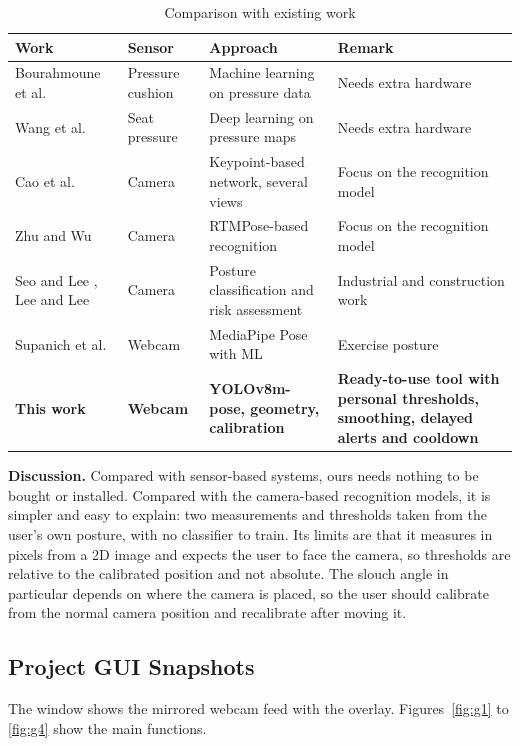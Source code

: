 ﻿\documentclass[12pt,a4paper]{article}
\begin{document}
\begin{table}[htpb]
\centering
\caption{Comparison with existing work}\label{tab:compare}
\footnotesize
\renewcommand{\arraystretch}{1.25}
\begin{tabularx}{\textwidth}{@{}>{\raggedright\arraybackslash}p{3.3cm}>{\raggedright\arraybackslash}p{2.5cm}>{\raggedright\arraybackslash}p{3.6cm}Y@{}}
\toprule
\textbf{Work} & \textbf{Sensor} & \textbf{Approach} & \textbf{Remark}\\
\midrule
Bourahmoune et al. \cite{bourahmoune2022cushion} & Pressure cushion & Machine learning on pressure data & Needs extra hardware\\
Wang et al. \cite{wang2025pressure} & Seat pressure & Deep learning on pressure maps & Needs extra hardware\\
Cao et al. \cite{cao2025keypointnet} & Camera & Keypoint-based network, several views & Focus on the recognition model\\
Zhu and Wu \cite{zhu2025rtmposelrf} & Camera & RTMPose-based recognition & Focus on the recognition model\\
Seo and Lee \cite{seo2021automated}, Lee and Lee \cite{lee2022see} & Camera & Posture classification and risk assessment & Industrial and construction work\\
Supanich et al. \cite{supanich2023mediapipe} & Webcam & MediaPipe Pose with ML & Exercise posture\\
\textbf{This work} & \textbf{Webcam} & \textbf{YOLOv8m-pose, geometry, calibration} & \textbf{Ready-to-use tool with personal thresholds, smoothing, delayed alerts and cooldown}\\
\bottomrule
\end{tabularx}
\end{table}

\textbf{Discussion.} Compared with sensor-based systems, ours needs nothing to be bought or
installed. Compared with the camera-based recognition models, it is simpler and easy to
explain: two measurements and thresholds taken from the user's own posture, with no
classifier to train. Its limits are that it measures in pixels from a 2D image and expects
the user to face the camera, so thresholds are relative to the calibrated position and not
absolute. The slouch angle in particular depends on where the camera is placed, so the
user should calibrate from the normal camera position and recalibrate after moving it.

\subsection{Project GUI Snapshots}
The window shows the mirrored webcam feed with the overlay. Figures~\ref{fig:g1} to
\ref{fig:g4} show the main functions.
\end{document}
